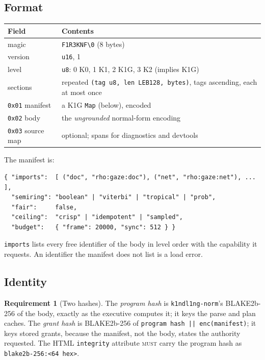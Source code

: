 \documentclass[11pt]{article}
\theoremstyle{definition}
\newtheorem{requirement}{Requirement}
\theoremstyle{remark}
\newcommand{\MUST}{\textsc{must}}
\newcommand{\code}[1]{\texttt{#1}}
\begin{document}
\subsection{Format}
\begin{center}\small
\begin{tabularx}{\linewidth}{@{}lX@{}}
\toprule
Field & Contents\\
\midrule
magic & \code{F1R3KNF\textbackslash0} (8 bytes)\\
version & \code{u16}, 1\\
level & \code{u8}: 0 K0, 1 K1, 2 K1G, 3 K2 (implies K1G)\\
sections & repeated \code{(tag u8, len LEB128, bytes)}, tags ascending, each at most once\\
\quad\code{0x01} manifest & a K1G \code{Map} (below), encoded\\
\quad\code{0x02} body & the \emph{ungrounded} normal-form encoding\\
\quad\code{0x03} source map & optional; spans for diagnostics and devtools\\
\bottomrule
\end{tabularx}
\end{center}

\noindent
The manifest is:
\begin{lstlisting}
{ "imports":  [ ("doc", "rho:gaze:doc"), ("net", "rho:gaze:net"), ... ],
  "semiring": "boolean" | "viterbi" | "tropical" | "prob",
  "fair":     false,
  "ceiling":  "crisp" | "idempotent" | "sampled",
  "budget":   { "frame": 20000, "sync": 512 } }
\end{lstlisting}
\code{imports} lists every free identifier of the body in level order with the
capability it requests. An identifier the manifest does not list is a load error.

\subsection{Identity}
\begin{requirement}[Two hashes]
The \emph{program hash} is \code{k1ndl1ng-norm}'s BLAKE2b-256 of the body, exactly
as the executive computes it; it keys the parse and plan caches. The \emph{grant
hash} is BLAKE2b-256 of \code{program hash || enc(manifest)}; it keys stored grants,
because the manifest, not the body, states the authority requested.
The HTML \code{integrity} attribute \MUST{} carry the program hash as
\code{blake2b-256:<64 hex>}.
\end{requirement}
\end{document}

